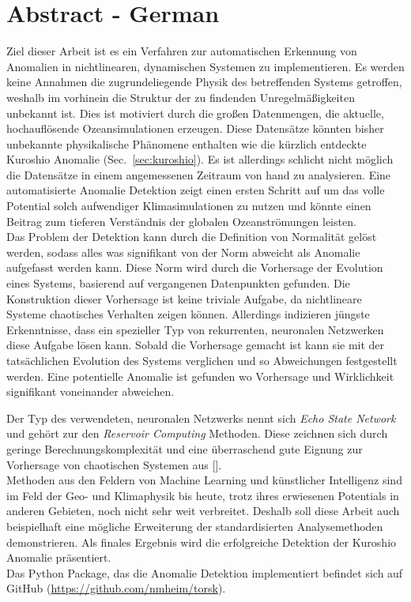 \section*{Abstract - German}%
\label{sec:abstract_de}

Ziel dieser Arbeit ist es ein Verfahren zur automatischen Erkennung von
Anomalien in nichtlinearen, dynamischen Systemen zu implementieren. Es werden
keine Annahmen die zugrundeliegende Physik des betreffenden Systems getroffen,
weshalb im vorhinein die Struktur der zu findenden Unregelm{\"a}{\ss}igkeiten unbekannt
ist. Dies ist motiviert durch die gro{\ss}en Datenmengen, die aktuelle,
hochaufl{\"o}sende Ozeansimulationen erzeugen. Diese Datens{\"a}tze k{\"o}nnten bisher
unbekannte physikalische Ph{\"a}nomene enthalten wie die k{\"u}rzlich entdeckte
Kuroshio Anomalie (Sec.~\ref{sec:kuroshio}).  Es ist allerdings schlicht nicht
m{\"o}glich die Datens{\"a}tze in einem angemessenen Zeitraum von hand zu analysieren.
Eine automatisierte Anomalie Detektion zeigt einen ersten Schritt auf um das
volle Potential solch aufwendiger Klimasimulationen zu nutzen und k{\"o}nnte einen
Beitrag zum tieferen Verst{\"a}ndnis der globalen Ozeanstr{\"o}mungen leisten.\\

Das Problem der Detektion kann durch die Definition von Normalit{\"a}t gel{\"o}st
werden, sodass alles was signifikant von der Norm abweicht als Anomalie
aufgefasst werden kann. Diese Norm wird durch die Vorhersage der Evolution
eines Systems, basierend auf vergangenen Datenpunkten gefunden. Die
Konstruktion dieser Vorhersage ist keine triviale Aufgabe, da nichtlineare
Systeme chaotisches Verhalten zeigen k{\"o}nnen. Allerdings indizieren j{\"u}ngste
Erkenntnisse, dass ein spezieller Typ von rekurrenten, neuronalen Netzwerken
diese Aufgabe l{\"o}sen kann. Sobald die Vorhersage gemacht ist kann sie mit der
tats{\"a}chlichen Evolution des Systems verglichen und so Abweichungen festgestellt
werden. Eine potentielle Anomalie ist gefunden wo Vorhersage und Wirklichkeit
signifikant voneinander abweichen.

Der Typ des verwendeten, neuronalen Netzwerks nennt sich \emph{Echo State
Network} und geh{\"o}rt zur den \emph{Reservoir Computing} Methoden. Diese zeichnen
sich durch geringe Berechnungskomplexit{\"a}t und eine {\"u}berraschend gute Eignung
zur Vorhersage von chaotischen Systemen aus [\cite{pathak2018model}].\\

Methoden aus den Feldern von Machine Learning und k{\"u}nstlicher Intelligenz sind
im Feld der Geo- und Klimaphysik bis heute, trotz ihres erwiesenen Potentials
in anderen Gebieten, noch nicht sehr weit verbreitet. Deshalb soll diese Arbeit
auch beispielhaft eine m{\"o}gliche Erweiterung der standardisierten
Analysemethoden demonstrieren. Als finales Ergebnis wird die erfolgreiche
Detektion der Kuroshio Anomalie pr{\"a}sentiert.\\

Das Python Package, das die Anomalie Detektion implementiert befindet sich
auf GitHub (\url{https://github.com/nmheim/torsk}).
